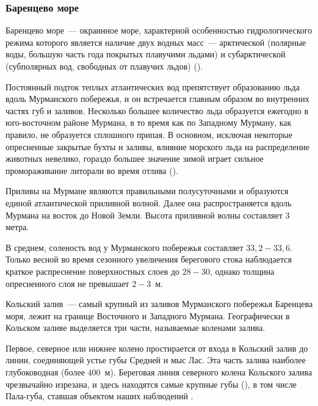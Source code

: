 \afterpage{\clearpage}

	\subsubsection{Баренцево море}

Баренцево море~--- окраинное море, характерной особенностью гидрологического режима которого является наличие двух  водных масс~--- арктической (полярные воды, большую часть года покрытых плавучими льдами) и субарктической (субполярных вод, свободных от плавучих льдов) (\cite{Adrov_1992}). 


Постоянный подток теплых атлантических вод препятствует образованию льда вдоль Мурманского побережья, и он встречается главным образом во внутренних частях губ и заливов.
Несколько большее количество льда образуется ежегодно в юго-восточном районе Мурмана, в то время как по Западному Мурману, как правило, не образуется сплошного припая. 
В основном, исключая некоторые опресненные закрытые бухты и заливы, влияние морского льда на распределение животных невелико, гораздо большее значение зимой играет сильное промораживание литорали во время отлива (\cite{Propp_1971}).

Приливы на Мурмане являются правильными полусуточными и образуются единой атлантической приливной волной. 
Далее она распространяется вдоль Мурмана на восток до Новой Земли. 
Высота приливной волны составляет $3$ метра. 

В среднем, соленость вод у Мурманского побережья составляет $33,2 - 33,6$\permil. 
Только весной во время сезонного увеличения берегового стока наблюдается краткое распреснение поверхностных слоев до $28 - 30$\permil, однако толщина опресненного слоя не превышает $2 - 3$~м.

Кольский залив~--- самый крупный из заливов Мурманского побережья Баренцева моря, лежит на границе Восточного и Западного Мурмана.
Географически в Кольском заливе выделяется три части, называемые коленами залива. 

Первое, северное или нижнее колено простирается от входа в Кольский залив до линии, соединяющей устье губы Средней и мыс Лас. 
Эта часть залива наиболее глубоководная (более $400$~м). 
Береговая линия северного колена Кольского залива чрезвычайно изрезана, и  здесь находятся самые крупные губы (\cite{Derugin_1915}), в том числе Пала-губа, ставшая объектом наших наблюдений .


